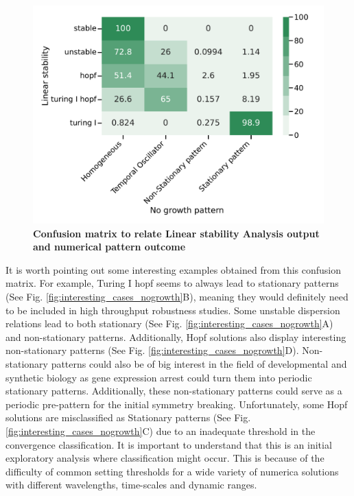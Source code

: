 \begin{figure}[H] %
    \centering
    \includegraphics[width=1\textwidth]{chapters/Chapter 1/lsa_vs_numerical_confusion_variant0-11-12} %
    \caption{\textbf{Confusion matrix to relate Linear stability Analysis output and numerical pattern outcome}}
    \label{fig:lsa_numerical_confusion} %
\end{figure}

It is worth pointing out some interesting examples obtained from this confusion matrix.
For example, Turing I hopf seems to always lead to stationary patterns (See Fig. \ref{fig:interesting_cases_nogrowth}B), meaning they would definitely need to be included in high throughput robustness studies.
Some unstable dispersion relations lead to both stationary (See Fig. \ref{fig:interesting_cases_nogrowth}A) and non-stationary patterns.
Additionally, Hopf solutions also display interesting non-stationary patterns (See Fig. \ref{fig:interesting_cases_nogrowth}D).
Non-stationary patterns could also be of big interest in the field of developmental and synthetic biology as gene expression arrest could turn them into periodic stationary patterns.
Additionally, these non-stationary patterns could serve as a periodic pre-pattern for the initial symmetry breaking.
Unfortunately, some Hopf solutions are misclassified as Stationary patterns (See Fig. \ref{fig:interesting_cases_nogrowth}C) due to an inadequate threshold in the convergence classification.
It is important to understand that this is an initial exploratory analysis where classification might occur. This is because of the difficulty of common setting thresholds for a wide variety of numerica solutions with different wavelengths, time-scales and dynamic ranges.

